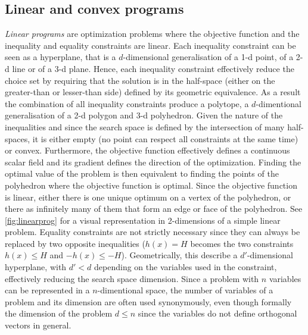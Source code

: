 	\subsection{Linear and convex programs}
	\emph{Linear programs} are optimization problems where the objective function and the inequality and equality constraints are linear.
	Each inequality constraint can be seen as a hyperplane, that is a $d$-dimensional generalisation of a 1-d point, of a 2-d line or of a 3-d plane.
	Hence, each inequality constraint effectively reduce the choice set by requiring that the solution is in the half-space (either on the greater-than or lesser-than side) defined by its geometric equivalence.
	As a result the combination of all inequality constraints produce a polytope, a $d$-dimentional generalisation of a 2-d polygon and 3-d polyhedron.
	Given the nature of the inequalities and since the search space is defined by the intersection of many half-spaces, it is either empty (no point can respect all constraints at the same time) or convex.
	Furthermore, the objective function effectively defines a continuous scalar field and its gradient defines the direction of the optimization.
	Finding the optimal value of the problem is then equivalent to finding the points of the polyhedron where the objective function is optimal.
	Since the objective function is linear, either there is one unique optimum on a vertex of the polyhedron, or there as infinitely many of them that form an edge or face of the polyhedron.
	See \cref{fig:linearprog} for a visual representation in 2-dimensions of a simple linear problem.
	Equality constraints are not strictly necessary since they can always be replaced by two opposite inequalities ($h(x) = H$ becomes the two constraints $h(x) \leq H$ and $-h(x) \leq -H$).
	Geometrically, this describe a $d'$-dimensional hyperplane, with $d' < d$ depending on the variables used in the constraint, effectively reducing the search space dimension.
	Since a problem with $n$ variables can be represented in a $n$-dimentional space, the number of variables of a problem and its dimension are often used synonymously, even though formally the dimension of the problem $d \leq n$ since the variables do not define orthogonal vectors in general.
	
